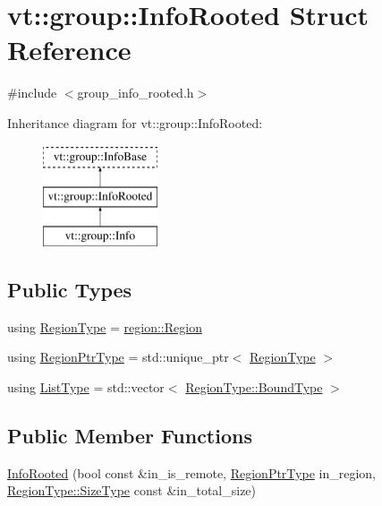 \hypertarget{structvt_1_1group_1_1_info_rooted}{}\section{vt\+:\+:group\+:\+:Info\+Rooted Struct Reference}
\label{structvt_1_1group_1_1_info_rooted}


{\ttfamily \#include $<$group\+\_\+info\+\_\+rooted.\+h$>$}

Inheritance diagram for vt\+:\+:group\+:\+:Info\+Rooted\+:\begin{figure}[H]
\begin{center}
\leavevmode
\includegraphics[height=3.000000cm]{structvt_1_1group_1_1_info_rooted}
\end{center}
\end{figure}
\subsection*{Public Types}
\begin{DoxyCompactItemize}
\item 
using \hyperlink{structvt_1_1group_1_1_info_rooted_a9d665331fedfc780eeb0efe16372e104}{Region\+Type} = \hyperlink{structvt_1_1group_1_1region_1_1_region}{region\+::\+Region}
\item 
using \hyperlink{structvt_1_1group_1_1_info_rooted_a127ac5ebcfb9871621c1f66dba481c0b}{Region\+Ptr\+Type} = std\+::unique\+\_\+ptr$<$ \hyperlink{structvt_1_1group_1_1_info_rooted_a9d665331fedfc780eeb0efe16372e104}{Region\+Type} $>$
\item 
using \hyperlink{structvt_1_1group_1_1_info_rooted_aab859fcabc7b137db51af4af86ebe56d}{List\+Type} = std\+::vector$<$ \hyperlink{structvt_1_1group_1_1region_1_1_region_abf426ff85bed72c1c6524fad6a9f1751}{Region\+Type\+::\+Bound\+Type} $>$
\end{DoxyCompactItemize}
\subsection*{Public Member Functions}
\begin{DoxyCompactItemize}
\item 
\hyperlink{structvt_1_1group_1_1_info_rooted_a2eae545681022b5595355823efdf6e0d}{Info\+Rooted} (bool const \&in\+\_\+is\+\_\+remote, \hyperlink{structvt_1_1group_1_1_info_rooted_a127ac5ebcfb9871621c1f66dba481c0b}{Region\+Ptr\+Type} in\+\_\+region, \hyperlink{structvt_1_1group_1_1region_1_1_region_a9bb381adf31111aae34dbc644bad6c1f}{Region\+Type\+::\+Size\+Type} const \&in\+\_\+total\+\_\+size)
\end{DoxyCompactItemize}
